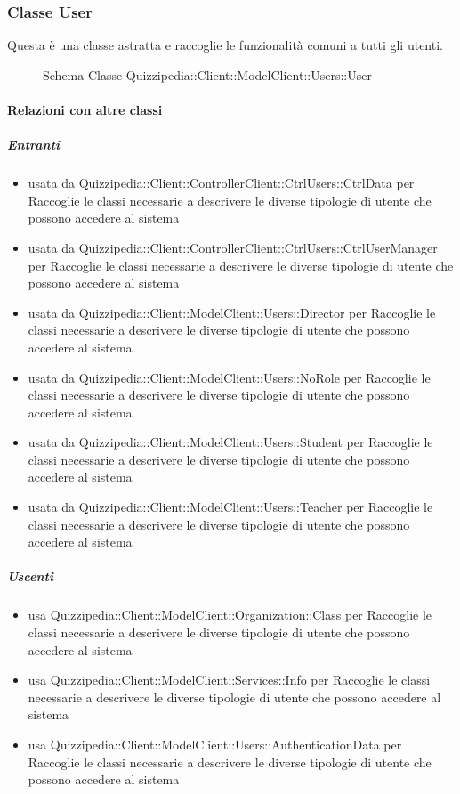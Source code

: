 \subsubsection{Classe User}
Questa è una classe astratta e raccoglie le funzionalità comuni a tutti gli utenti.
\begin{figure}[H]
\centering
\noindent{}
\caption[Schema Classe User]{Schema Classe Quizzipedia::Client::ModelClient::Users::User}
\end{figure}
\paragraph{Relazioni con altre classi}
\subparagraph{Entranti}
\begin{itemize}
\item usata da Quizzipedia::Client::ControllerClient::CtrlUsers::CtrlData per Raccoglie le classi necessarie a descrivere le diverse tipologie di utente che possono accedere al sistema
\item usata da Quizzipedia::Client::ControllerClient::CtrlUsers::CtrlUserManager per Raccoglie le classi necessarie a descrivere le diverse tipologie di utente che possono accedere al sistema
\item usata da Quizzipedia::Client::ModelClient::Users::Director per Raccoglie le classi necessarie a descrivere le diverse tipologie di utente che possono accedere al sistema
\item usata da Quizzipedia::Client::ModelClient::Users::NoRole per Raccoglie le classi necessarie a descrivere le diverse tipologie di utente che possono accedere al sistema
\item usata da Quizzipedia::Client::ModelClient::Users::Student per Raccoglie le classi necessarie a descrivere le diverse tipologie di utente che possono accedere al sistema
\item usata da Quizzipedia::Client::ModelClient::Users::Teacher per Raccoglie le classi necessarie a descrivere le diverse tipologie di utente che possono accedere al sistema
\end{itemize}
\subparagraph{Uscenti}
\begin{itemize}
\item usa Quizzipedia::Client::ModelClient::Organization::Class per Raccoglie le classi necessarie a descrivere le diverse tipologie di utente che possono accedere al sistema
\item usa Quizzipedia::Client::ModelClient::Services::Info per Raccoglie le classi necessarie a descrivere le diverse tipologie di utente che possono accedere al sistema
\item usa Quizzipedia::Client::ModelClient::Users::AuthenticationData per Raccoglie le classi necessarie a descrivere le diverse tipologie di utente che possono accedere al sistema
\end{itemize}
